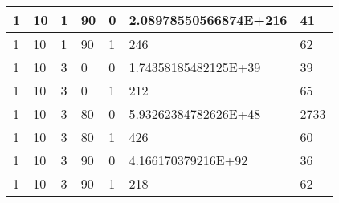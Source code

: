 \documentclass{article}
\theoremstyle{definition}
\begin{document}
\begin{table}[]
\begin{tabular}{|l|l|l|l|l|l|l|}
1                                      & 10                                      & 1                                      & 90                                   & 0                                      & 2.08978550566874E+216                    & 41                                     \\ \hline
1                                      & 10                                      & 1                                      & 90                                   & 1                                      & 246                                      & 62                                     \\ \hline
1                                      & 10                                      & 3                                      & 0                                    & 0                                      & 1.74358185482125E+39                     & 39                                     \\ \hline
1                                      & 10                                      & 3                                      & 0                                    & 1                                      & 212                                      & 65                                     \\ \hline
1                                      & 10                                      & 3                                      & 80                                   & 0                                      & 5.93262384782626E+48                     & 2733                                   \\ \hline
1                                      & 10                                      & 3                                      & 80                                   & 1                                      & 426                                      & 60                                     \\ \hline
1                                      & 10                                      & 3                                      & 90                                   & 0                                      & 4.166170379216E+92                       & 36                                     \\ \hline
1                                      & 10                                      & 3                                      & 90                                   & 1                                      & 218                                      & 62                                     \\ \hline

\end{tabular}
\end{table}
\end{document}
